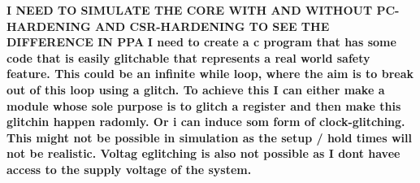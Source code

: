 
\textbf{I NEED TO SIMULATE THE CORE WITH AND WITHOUT PC-HARDENING AND CSR-HARDENING TO SEE THE DIFFERENCE IN PPA}
\textbf{I need to create a c program that has some code that is easily glitchable that represents a real world safety feature. This could be an infinite while loop, where the aim is to break out of this loop using a glitch. To achieve this I can either make a module whose sole purpose is to glitch a register and then make this glitchin happen radomly. Or i can induce som form of clock-glitching. This might not be possible in simulation as the setup / hold times will not be realistic. Voltag eglitching is also not possible as I dont havee access to the supply voltage of the system.}

